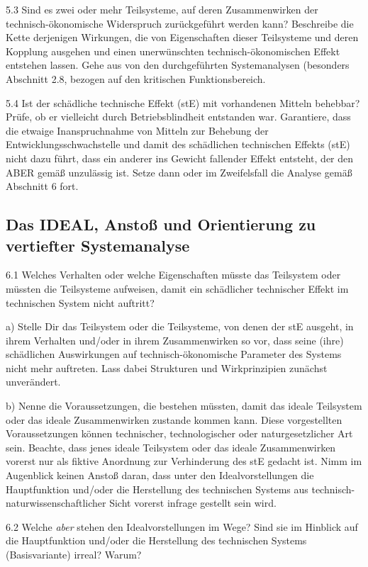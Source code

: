 \documentclass[12pt,a4paper]{article}
\begin{document}
5.3 Sind es zwei oder mehr Teilsysteme, auf deren Zusammenwirken der
technisch-ökonomische Widerspruch zurückgeführt werden kann? Beschreibe die
Kette derjenigen Wirkungen, die von Eigenschaften dieser Teilsysteme und deren
Kopplung ausgehen und einen unerwünschten technisch-ökonomischen Effekt
entstehen lassen. Gehe aus von den durchgeführten Systemanalysen (besonders
Abschnitt 2.8, bezogen auf den kritischen Funktionsbereich.

5.4 Ist der schädliche technische Effekt (stE) mit vorhandenen Mitteln
behebbar? Prüfe, ob er vielleicht durch Betriebsblindheit entstanden war.
Garantiere, dass die etwaige Inanspruchnahme von Mitteln zur Behebung der
Entwicklungsschwachstelle und damit des schädlichen technischen Effekts (stE)
nicht dazu führt, dass ein anderer ins Gewicht fallender Effekt entsteht, der
den ABER gemäß unzulässig ist. Setze dann oder im Zweifelsfall die Analyse
gemäß Abschnitt 6 fort.

\subsection{Das IDEAL, Anstoß und Orientierung zu vertiefter Systemanalyse}

6.1 Welches Verhalten oder welche Eigenschaften müsste das Teilsystem oder
müssten die Teilsysteme aufweisen, damit ein schädlicher technischer Effekt im
technischen System nicht auftritt?

a) Stelle Dir das Teilsystem oder die Teilsysteme, von denen der stE ausgeht,
in ihrem Verhalten und/oder in ihrem Zusammenwirken so vor, dass seine (ihre)
schädlichen Auswirkungen auf technisch-ökonomische Parameter des Systems nicht
mehr auftreten. Lass dabei Strukturen und Wirkprinzipien zunächst unverändert.

b) Nenne die Voraussetzungen, die bestehen müssten, damit das ideale Teilsystem
oder das ideale Zusammenwirken zustande kommen kann. Diese vorgestellten
Voraussetzungen können technischer, technologischer oder naturgesetzlicher Art
sein.  Beachte, dass jenes ideale Teilsystem oder das ideale Zusammenwirken
vorerst nur als fiktive Anordnung zur Verhinderung des stE gedacht ist.  Nimm
im Augenblick keinen Anstoß daran, dass unter den Idealvorstellungen die
Hauptfunktion und/oder die Herstellung des technischen Systems aus
technisch-naturwissenschaftlicher Sicht vorerst infrage gestellt sein wird.

6.2 Welche \emph{aber} stehen den Idealvorstellungen im Wege? Sind sie im
Hinblick auf die Hauptfunktion und/oder die Herstellung des technischen Systems
(Basisvariante) irreal? Warum?
\end{document}
